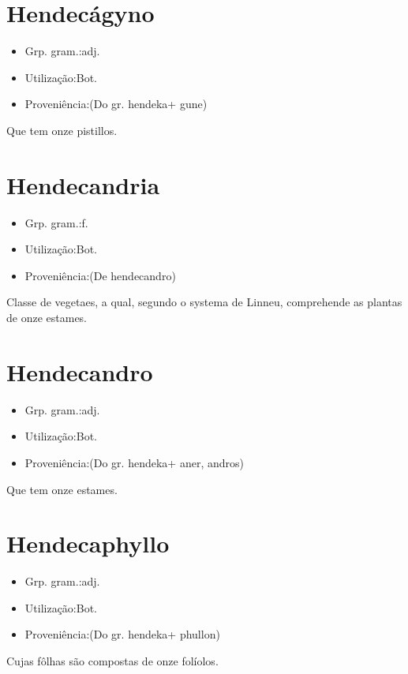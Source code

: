 \documentclass{article}
\begin{document}
\section{Hendecágyno}
\begin{itemize}
\item {Grp. gram.:adj.}
\end{itemize}
\begin{itemize}
\item {Utilização:Bot.}
\end{itemize}
\begin{itemize}
\item {Proveniência:(Do gr. \textunderscore hendeka\textunderscore  + \textunderscore gune\textunderscore )}
\end{itemize}
Que tem onze pistillos.
\section{Hendecandria}
\begin{itemize}
\item {Grp. gram.:f.}
\end{itemize}
\begin{itemize}
\item {Utilização:Bot.}
\end{itemize}
\begin{itemize}
\item {Proveniência:(De \textunderscore hendecandro\textunderscore )}
\end{itemize}
Classe de vegetaes, a qual, segundo o systema de Linneu, comprehende as plantas de onze estames.
\section{Hendecandro}
\begin{itemize}
\item {Grp. gram.:adj.}
\end{itemize}
\begin{itemize}
\item {Utilização:Bot.}
\end{itemize}
\begin{itemize}
\item {Proveniência:(Do gr. \textunderscore hendeka\textunderscore  + \textunderscore aner\textunderscore , \textunderscore andros\textunderscore )}
\end{itemize}
Que tem onze estames.
\section{Hendecaphyllo}
\begin{itemize}
\item {Grp. gram.:adj.}
\end{itemize}
\begin{itemize}
\item {Utilização:Bot.}
\end{itemize}
\begin{itemize}
\item {Proveniência:(Do gr. \textunderscore hendeka\textunderscore  + \textunderscore phullon\textunderscore )}
\end{itemize}
Cujas fôlhas são compostas de onze folíolos.
\end{document}
